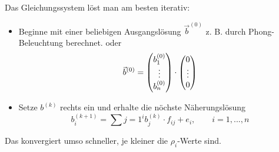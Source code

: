 Das Gleichungssystem löst man am besten iterativ:
\begin{itemize}
 \item Beginne mit einer beliebigen Ausgangslösung $\vec b^{(0)}$ z. B. durch Phong-Beleuchtung berechnet. oder
	\[\vec b^{(0)} = \begin{pmatrix}b_1^{(0)}\\\vdots\\b_n^{(0)}\end{pmatrix} \cdot \begin{pmatrix}0\\\vdots\\0\end{pmatrix}\]
 \item Setze $b^{(k)}$ rechts ein und erhalte die nöchste Näherungslösung
	\[\boxed{b_i^{(k+1)} = \sum\limits{j=1}^i b_j^{(k)} \cdot f_{ij} + e_i}, \qquad i = 1, ..., n\]
\end{itemize}
Das konvergiert umso schneller, je kleiner die $\rho_i$-Werte sind.

